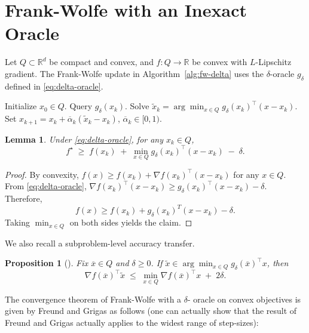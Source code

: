\documentclass[smallextended]{svjour3}
\newtheorem{prop}[theorem]{Proposition}
\newtheorem{lem}[theorem]{Lemma}
\newcommand{\RR}{\mathbb{R}}
\begin{document}
\section{Frank-Wolfe with an Inexact Oracle}\label{sec:delta}

Let $Q\subset\RR^d$ be compact and convex, and $f:Q\to\RR$ be convex with $L$-Lipschitz gradient. The Frank-Wolfe update in Algorithm~\ref{alg:fw-delta} uses the $\delta$-oracle $g_\delta$ defined in \eqref{eq:delta-oracle}.
\begin{algorithm}[h]
\caption{Frank-Wolfe with a $\delta$-oracle}
\label{alg:fw-delta}
\begin{algorithmic}[1]
\State Initialize $x_0\in Q$.
\State Query $g_\delta(x_k)$.
\State Solve $\tilde x_k=\arg\min_{x\in Q}g_\delta(x_k)^\top(x-x_k)$.
\State Set $x_{k+1}=x_k+\overline\alpha_k(\tilde x_k-x_k)$, $\overline\alpha_k\in[0,1)$.
\EndFor
\end{algorithmic}
\end{algorithm}

\begin{lem}\label{lem:wolfe-transfer}
Under \eqref{eq:delta-oracle}, for any $x_k\in Q$,
\[
f^\star \;\ge\; f(x_k) \;+\; \min_{x\in Q} g_\delta(x_k)^\top(x-x_k) \;-\; \delta .
\]
\end{lem}
\begin{proof}
By convexity, $f(x)\ge f(x_k)+\nabla f(x_k)^\top(x-x_k)$ for any $x\in Q$. From \eqref{eq:delta-oracle},
$\nabla f(x_k)^\top(x-x_k)\ge g_\delta(x_k)^\top(x-x_k)-\delta$. Therefore,
\[f(x) \geq f(x_k) + g_\delta(x_k)^T (x - x_k) - \delta.\]
Taking $\min_{x\in Q}$ on both sides yields the claim.
\end{proof}

We also recall a subproblem-level accuracy transfer.
\begin{prop}[{\cite[Prop.\ 5.1]{FreundGrigas2013}}]\label{prop:FG-subproblem}
Fix $\overline x\in Q$ and $\delta\ge 0$. If $\tilde x\in\arg\min_{x\in Q} g_\delta(\overline x)^\top x$, then
\[
\nabla f(\overline x)^\top\tilde x \;\le\; \min_{ x\in Q} \nabla f(\overline x)^\top x \;+\; 2\delta .
\]
\end{prop}

The convergence theorem of Frank-Wolfe with a $\delta$- oracle on convex objectives is given by Freund and Grigas as follows (one can actually show that the result of Freund and Grigas actually applies to the widest range of step-sizes): 
\end{document}
